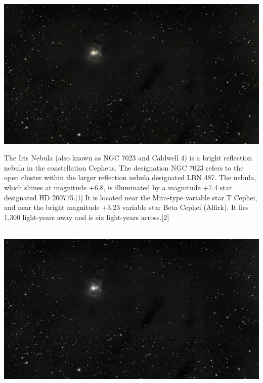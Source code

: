 \includegraphics[width=\textwidth]{../Imaging//Original/Iris_Nebula.jpg}
{\footnotesize\color{white}
The Iris Nebula (also known as NGC 7023 and Caldwell 4) is a bright reflection nebula in the constellation Cepheus. The designation NGC 7023 refers to the open cluster within the larger reflection nebula designated LBN 487. The nebula, which shines at magnitude +6.8, is illuminated by a magnitude +7.4 star designated HD 200775.[1] It is located near the Mira-type variable star T Cephei, and near the bright magnitude +3.23 variable star Beta Cephei (Alfirk). It lies 1,300 light-years away and is six light-years across.[2]




}\ \\
\includegraphics[width=\textwidth]{../Imaging//Grayscale/Iris_Nebula.jpg}
